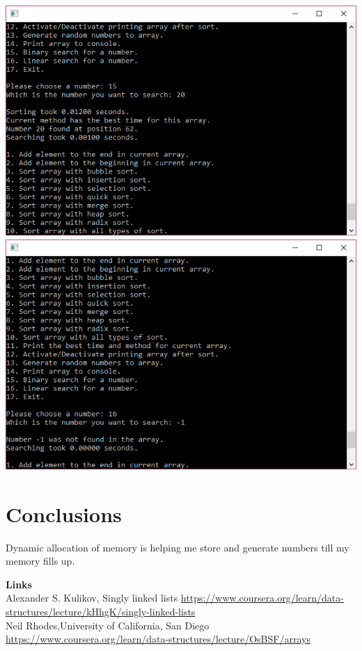 \documentclass{article}
\begin{document}
\begin{center}
\includegraphics[scale=0.90]{c4.png} \\
\includegraphics[scale=0.90]{c5.png} \\
\end{center}
\pagebreak


\section{Conclusions}
\textbf{}
\indent Dynamic allocation of memory is helping me store and generate numbers till my memory fills up.


\begin{thebibliography}{9}

	 {\bf Links} \\
	 Alexander S. Kulikov, Singly linked lists \url{https://www.coursera.org/learn/data-structures/lecture/kHhgK/singly-linked-lists} \\
	 Neil Rhodes,University of California, San Diego \url{https://www.coursera.org/learn/data-structures/lecture/OsBSF/arrays}

\end{thebibliography}
\end{document}
